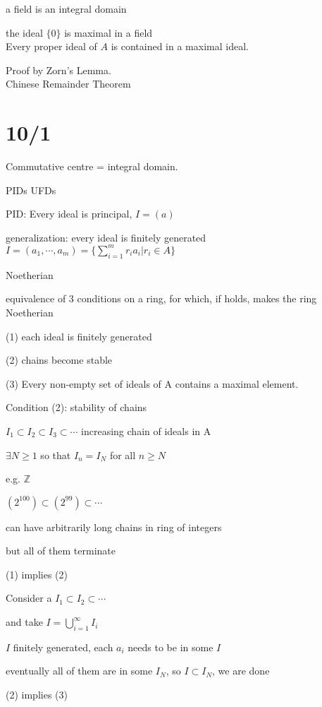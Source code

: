 \documentclass[12pt]{article}
\begin{document}
a field is an integral domain

the ideal $\{0\}$ is maximal in a field\\

\noindent
Every proper ideal of $A$ is contained in a maximal ideal.

Proof by Zorn's Lemma.\\

\noindent
Chinese Remainder Theorem

\section{10/1}

Commutative centre = integral domain.

\noindent
PIDs UFDs

\noindent
PID: Every ideal is principal, $I = (a)$

generalization: every ideal is finitely generated $I = (a_1, \cdots, a_m) = \{\sum_{i=1}^mr_ia_i | r_i \in A\}$

Noetherian

\noindent
equivalence of 3 conditions on a ring, for which, if holds, makes the ring Noetherian

(1) each ideal is finitely generated

(2) chains become stable

(3) Every non-empty set of ideals of A contains a maximal element.

\noindent
Condition (2): stability of chains

$I_1 \subset I_2 \subset I_3 \subset \cdots$ increasing chain of ideals in A

$\exists N \geq 1$ so that $I_n = I_N$ for all $n \geq N$

\noindent
e.g. $\mathds{Z}$

$(2^{100}) \subset (2^{99}) \subset \cdots$

can have arbitrarily long chains in ring of integers

but all of them terminate

\noindent
(1) implies (2)

Consider a $I_1 \subset I_2 \subset \cdots$

and take $I = \bigcup_{i = 1}^\infty I_i$

$I$ finitely generated, each $a_i$ needs to be in some $I$

eventually all of them are in some $I_N$, so $I \subset I_N$, we are done

\noindent
(2) implies (3)
\end{document}
